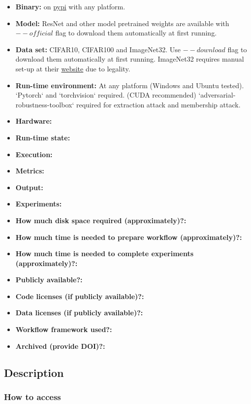 \documentclass[letterpaper,twocolumn,10pt]{article}
\begin{document}
{\small
\begin{itemize}
  \item {\bf Binary: } on \href{https://pypi.org/project/autovul/}{pypi} with any platform.
  \item {\bf Model: } ResNet and other model pretrained weights are available with $--official$ flag to download them automatically at first running.
  \item {\bf Data set: } CIFAR10, CIFAR100 and ImageNet32. Use $--download$ flag to download them automatically at first running. ImageNet32 requires manual set-up at their \href{https://image-net.org/download-images.php}{website} due to legality.
  \item {\bf Run-time environment: }
  At any platform (Windows and Ubuntu tested).  
  `Pytorch` and `torchvision` required. (CUDA recommended)  
  `adversarial-robustness-toolbox` required for extraction attack and membership attack.
  \item {\bf Hardware: }
  \item {\bf Run-time state: }
  \item {\bf Execution: }
  \item {\bf Metrics: }
  \item {\bf Output: }
  \item {\bf Experiments: }
  \item {\bf How much disk space required (approximately)?: }
  \item {\bf How much time is needed to prepare workflow (approximately)?: }
  \item {\bf How much time is needed to complete experiments (approximately)?: }
  \item {\bf Publicly available?: }
  \item {\bf Code licenses (if publicly available)?: }
  \item {\bf Data licenses (if publicly available)?: }
  \item {\bf Workflow framework used?: }
  \item {\bf Archived (provide DOI)?: }
\end{itemize}

\subsection{Description}

\subsubsection{How to access}

}
\end{document}

